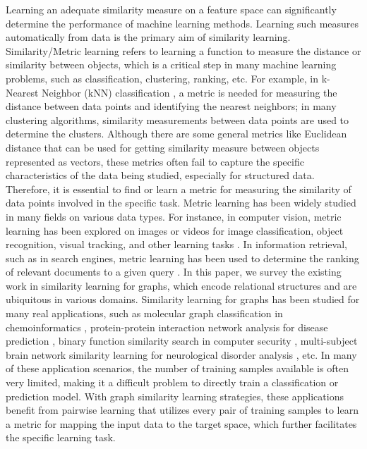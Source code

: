 

\label{sec:intro}
Learning an adequate similarity measure on a feature space can significantly determine the performance of machine learning methods. Learning such measures automatically from data is the primary aim of similarity learning. 
Similarity/Metric learning refers to learning a function to measure the distance or similarity between objects, which is a critical step in many machine learning problems, such as classification, clustering, ranking, etc. For example, in k-Nearest Neighbor (kNN) classification , a metric is needed for measuring the distance between data points and identifying the nearest neighbors; in many clustering algorithms, similarity measurements between data points are used to determine the clusters. Although there are some general metrics like Euclidean distance that can be used for getting similarity measure between objects represented as vectors, these metrics often fail to capture the specific characteristics of the data being studied, especially for structured data. Therefore, it is essential to find or learn a metric for measuring the similarity of data points involved in the specific task. 
Metric learning has been widely studied in many fields on various data types. For instance, in computer vision, metric learning has been explored on images or videos for image classification, object recognition, visual tracking, and other learning tasks . In information retrieval, such as in search engines, metric learning has been used to determine the ranking of relevant documents to a given query . In this paper, we survey the existing work in similarity learning for graphs, which encode relational structures and are ubiquitous in various domains. 
Similarity learning for graphs has been studied for many real applications, such as molecular graph classification in chemoinformatics , protein-protein interaction network analysis for disease prediction , binary function similarity search in computer security , multi-subject brain network similarity learning for neurological disorder analysis , etc. In many of these application scenarios, the number of training samples available is often very limited, making it a difficult problem to directly train a classification or prediction model. With graph similarity learning strategies, these applications benefit from pairwise learning that utilizes every pair of training samples to learn a metric for mapping the input data to the target space, which further facilitates the specific learning task. 
